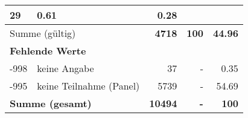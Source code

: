 \begin{longtable}{lXrrr}
       \num{29} &
       \num[round-mode=places,round-precision=2]{0.61} &
         \num[round-mode=places,round-precision=2]{0.28} \\
     \midrule
     \multicolumn{2}{l}{Summe (gültig)} &
       \textbf{\num{4718}} &
     \textbf{\num{100}} &
       \textbf{\num[round-mode=places,round-precision=2]{44.96}} \\
     \multicolumn{5}{l}{\textbf{Fehlende Werte}}\\
       -998 &
       keine Angabe &
         \num{37} &
        - &
         \num[round-mode=places,round-precision=2]{0.35} \\
       -995 &
       keine Teilnahme (Panel) &
         \num{5739} &
        - &
         \num[round-mode=places,round-precision=2]{54.69} \\
     \midrule
     \multicolumn{2}{l}{\textbf{Summe (gesamt)}} &
          \textbf{\num{10494}} &
        \textbf{-} &
        \textbf{\num{100}} \\
     \bottomrule
     \end{longtable}
     
